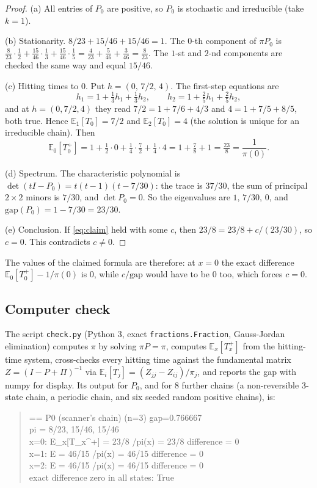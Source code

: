 \documentclass[11pt,a4paper]{article}
\begin{document}
\begin{proof}
(a) All entries of $P_0$ are positive, so $P_0$ is stochastic and irreducible (take $k=1$).

(b) Stationarity. $8/23+15/46+15/46=1$. The $0$-th component of $\pi P_0$ is $\tfrac{8}{23}\cdot\tfrac12+\tfrac{15}{46}\cdot\tfrac13+\tfrac{15}{46}\cdot\tfrac15=\tfrac{4}{23}+\tfrac{5}{46}+\tfrac{3}{46}=\tfrac{8}{23}$. The $1$-st and $2$-nd components are checked the same way and equal $15/46$.

(c) Hitting times to $0$. Put $h=(0,\,7/2,\,4)$. The first-step equations are
\[
h_1=1+\tfrac13 h_1+\tfrac13 h_2,\qquad h_2=1+\tfrac25 h_1+\tfrac25 h_2,
\]
and at $h=(0,7/2,4)$ they read $7/2=1+7/6+4/3$ and $4=1+7/5+8/5$, both true. Hence $\mathbb{E}_1[T_0]=7/2$ and $\mathbb{E}_2[T_0]=4$ (the solution is unique for an irreducible chain). Then
\[
\mathbb{E}_0[T_0^+]=1+\tfrac12\cdot 0+\tfrac14\cdot\tfrac72+\tfrac14\cdot 4=1+\tfrac78+1=\tfrac{23}{8}=\frac{1}{\pi(0)}.
\]

(d) Spectrum. The characteristic polynomial is $\det(tI-P_0)=t(t-1)(t-7/30)$: the trace is $37/30$, the sum of principal $2\times 2$ minors is $7/30$, and $\det P_0=0$. So the eigenvalues are $1,\,7/30,\,0$, and $\mathrm{gap}(P_0)=1-7/30=23/30$.

(e) Conclusion. If \eqref{eq:claim} held with some $c$, then $23/8=23/8+c/(23/30)$, so $c=0$. This contradicts $c\neq 0$.
\end{proof}

\noindent The values of the claimed formula are therefore: at $x=0$ the exact difference $\mathbb{E}_0[T_0^+]-1/\pi(0)$ is $0$, while $c/\mathrm{gap}$ would have to be $0$ too, which forces $c=0$.

\subsection*{Computer check}

The script \texttt{check.py} (Python 3, exact \texttt{fractions.Fraction}, Gauss-Jordan elimination) computes $\pi$ by solving $\pi P=\pi$, computes $\mathbb{E}_x[T_x^+]$ from the hitting-time system, cross-checks every hitting time against the fundamental matrix $Z=(I-P+\Pi)^{-1}$ via $\mathbb{E}_i[T_j]=(Z_{jj}-Z_{ij})/\pi_j$, and reports the gap with numpy for display. Its output for $P_0$, and for 8 further chains (a non-reversible 3-state chain, a periodic chain, and six seeded random positive chains), is:

\begin{quote}\ttfamily\footnotesize
== P0 (scanner's chain) (n=3) gap=0.766667\\
pi = 8/23, 15/46, 15/46\\
x=0: E\_x[T\_x\textasciicircum +] = 23/8 /pi(x) = 23/8 \; difference = 0\\
x=1: E = 46/15 /pi(x) = 46/15 \; difference = 0\\
x=2: E = 46/15 /pi(x) = 46/15 \; difference = 0\\
exact difference zero in all states: True
\end{quote}
\end{document}
